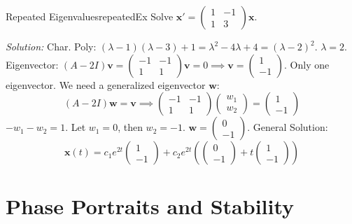 \documentclass{book}
\begin{document}
\begin{example}{Repeated Eigenvalues}{repeatedEx}
    Solve $\mathbf{x}' = \begin{pmatrix} 1 & -1 \\ 1 & 3 \end{pmatrix}\mathbf{x}$.

    \emph{Solution:}
    Char. Poly: $(\lambda - 1)(\lambda - 3) + 1 = \lambda^2 - 4\lambda + 4 = (\lambda - 2)^2$. $\lambda = 2$.
    Eigenvector: $(A - 2I)\mathbf{v} = \begin{pmatrix} -1 & -1 \\ 1 & 1 \end{pmatrix}\mathbf{v} = 0 \implies \mathbf{v} = \begin{pmatrix} 1 \\ -1 \end{pmatrix}$.
    Only one eigenvector. We need a generalized eigenvector $\mathbf{w}$:
    \[
        (A - 2I)\mathbf{w} = \mathbf{v} \implies \begin{pmatrix} -1 & -1 \\ 1 & 1 \end{pmatrix} \begin{pmatrix} w_1 \\ w_2 \end{pmatrix} = \begin{pmatrix} 1 \\ -1 \end{pmatrix}
    \]
    $-w_1 - w_2 = 1$. Let $w_1 = 0$, then $w_2 = -1$. $\mathbf{w} = \begin{pmatrix} 0 \\ -1 \end{pmatrix}$.
    General Solution:
    \[
        \mathbf{x}(t) = c_1 e^{2t}\begin{pmatrix} 1 \\ -1 \end{pmatrix} + c_2 e^{2t} \left( \begin{pmatrix} 0 \\ -1 \end{pmatrix} + t \begin{pmatrix} 1 \\ -1 \end{pmatrix} \right)
    \]
\end{example}

\section{Phase Portraits and Stability}
\end{document}
